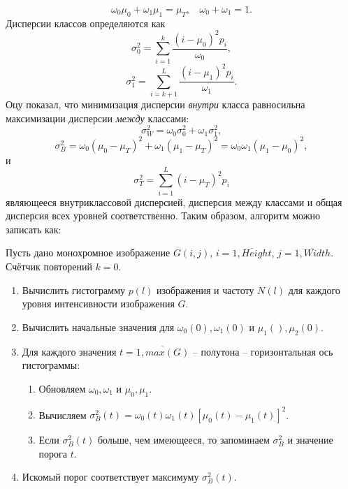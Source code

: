 \begin{equation}
	\omega_0\mu_0+\omega_1\mu_1=\mu_T,~~~~\omega_0+\omega_1=1.
	\label{sum_otsu}
\end{equation} 
Дисперсии классов определяются как
\begin{equation}
	\sigma_0^2=\sum_{i=1}^k{\frac{(i-\mu_0)^2p_i}{\omega_0}},
	\label{disp1}
\end{equation}
\begin{equation}
	\sigma_1^2=\sum_{i=k+1}^L{\frac{(i-\mu_1)^2p_i}{\omega_1}}.
\end{equation}
Оцу показал, что минимизация дисперсии {\it внутри} класса 
равносильна максимизации дисперсии {\it между} классами:
\begin{equation}
	\sigma_W^2=\omega_0\sigma_0^2+\omega_1\sigma_1^2,
	\label{sigma_w}
\end{equation}
\begin{equation}
	\sigma_B^2=\omega_0(\mu_0-\mu_T)^2 + \omega_1(\mu_1-\mu_T)^2=
	\omega_0\omega_1(\mu_1-\mu_0)^2,
	\label{sigma_B}
\end{equation}
и
\begin{equation}
	\sigma_T^2=\sum^L_{i=1}{(i-\mu_T)^2p_i}
\end{equation}
являющееся внутриклассовой дисперсией, дисперсия между классами и общая
дисперсия всех уровней соответственно.
Таким образом, алгоритм можно записать как:

Пусть дано монохромное изображение $G(i,j)$, $i=\overline{1, Height}$,
$j=\overline{1,Width}$. Счётчик повторений $k=0$.
\begin{enumerate}
	\item Вычислить гистограмму $p(l)$ изображения и частоту $N(l)$ для
каждого уровня интенсивности изображения $G$.
	\item Вычислить начальные значения для $\omega_0(0),\omega_1(0)$ и 
$\mu_1(),\mu_2(0)$.
	\item Для каждого значения $t=\overline{1,max(G)}$ -- полутона --
горизонтальная ось гистограммы:
	\begin{enumerate}
		\item Обновляем $\omega_0,\omega_1$ и $\mu_0,\mu_1$.
		\item Вычисляем $\sigma_B^2(t)=\omega_0(t)\omega_1(t)[\mu_0(t)-
\mu_1(t)]^2$.
		\item Если $\sigma_B^2(t)$ больше, чем имеющееся, то запоминаем
$\sigma_B^2$ и значение порога $t$.
	\end{enumerate}
	\item Искомый порог соответствует максимуму $\sigma_B^2(t)$.
\end{enumerate}
 

